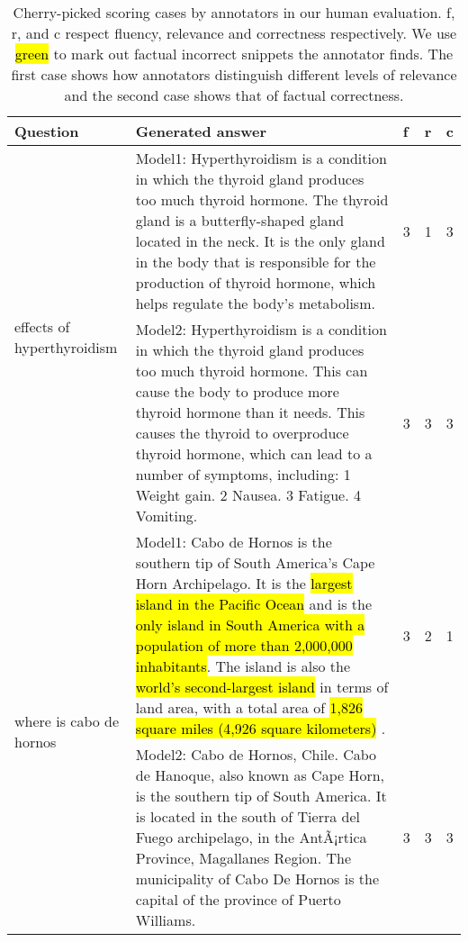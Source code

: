 \documentclass[11pt]{article}
\DeclareRobustCommand{\hlgreen}[1]{{\sethlcolor{soulgreen}\hl{#1}}}
\begin{document}
\begin{table*}[htbp]\small
\begin{tabular}{|p{100pt}|p{250pt}|l|l|l|}
\hline
 Question & Generated answer & f & r & c \\ \hline
\multirow{2}{*}{effects of hyperthyroidism} &  Model1: Hyperthyroidism is a condition in which the thyroid gland produces too much thyroid hormone. The thyroid gland is a butterfly-shaped gland located in the neck. It is the only gland in the body that is responsible for the production of thyroid hormone, which helps regulate the body's metabolism. & 3 & 1 & 3 \\ \cline{2-5} 
 & Model2: Hyperthyroidism is a condition in which the thyroid gland produces too much thyroid hormone. This can cause the body to produce more thyroid hormone than it needs. This causes the thyroid to overproduce thyroid hormone, which can lead to a number of symptoms, including: 1  Weight gain. 2  Nausea. 3  Fatigue. 4  Vomiting. & 3 & 3 & 3 \\ \hline
\multirow{2}{*}{where is cabo de hornos} &  Model1: Cabo de Hornos is the southern tip of South America's Cape Horn Archipelago. It is the \hlgreen{largest island in the Pacific Ocean} and is the \hlgreen{only island in South America with a population of more than 2,000,000 inhabitants}. The island is also the \hlgreen{world's second-largest island} in terms of land area, with a total area of \hlgreen{1,826 square miles (4,926 square kilometers)} . & 3 & 2 & 1 \\ \cline{2-5} 
 &  Model2: Cabo de Hornos, Chile. Cabo de Hanoque, also known as Cape Horn, is the southern tip of South America. It is located in the south of Tierra del Fuego archipelago, in the AntÃ¡rtica Province, Magallanes Region. The municipality of Cabo De Hornos is the capital of the province of Puerto Williams. & 3 & 3 & 3 \\ \hline
\end{tabular}
\caption{Cherry-picked scoring cases by annotators in our human evaluation. f, r, and c respect fluency, relevance and correctness respectively. We use \hlgreen{green} to mark out factual incorrect snippets the annotator finds. The first case shows how annotators distinguish different levels of relevance and the second case shows that of factual correctness.}
\label{tab:human eval cases}
\end{table*}
\end{document}
